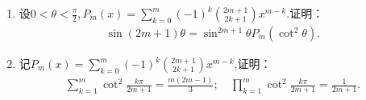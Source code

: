 \documentclass[../../main.tex]{subfiles}%
\begin{document}
\begin{theorem}\label{theorem:cot三角函数的一些基本性质}
\begin{enumerate}[(1)]
\item\label{theorem:cot三角函数的一些基本性质-1} 设$0 < \theta < \frac{\pi}{2}, P_m(x) = \sum\limits_{k=0}^{m} (-1)^k\binom{2m+1}{2k+1}x^{m-k}.$证明：
\begin{align*}
\sin(2m + 1)\theta = \sin^{2m+1}\theta P_m(\cot^2\theta).
\end{align*}

\item\label{theorem:cot三角函数的一些基本性质-2} 记$P_m(x) = \sum\limits_{k=0}^{m} (-1)^k\binom{2m+1}{2k+1}x^{m-k}$,证明：
\begin{align*}
\sum\limits_{k=1}^{m} \cot^2 \frac{k\pi}{2m + 1} = \frac{m(2m - 1)}{3};\quad \prod\limits_{k=1}^{m} \cot^2 \frac{k\pi}{2m + 1} = \frac{1}{2m + 1}.
\end{align*}
\end{enumerate}
\end{theorem}
\end{document}
